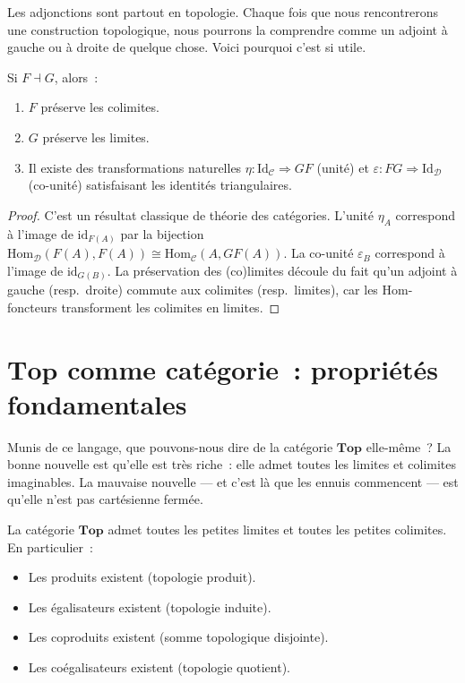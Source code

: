 Les adjonctions sont partout en topologie. Chaque fois que nous
rencontrerons une construction topologique, nous pourrons la comprendre
comme un adjoint \`a gauche ou \`a droite de quelque chose. Voici pourquoi
c'est si utile.

\begin{theoreme}
Si $F \dashv G$, alors~:
\begin{enumerate}
  \item $F$ pr\'eserve les colimites.
  \item $G$ pr\'eserve les limites.
  \item Il existe des transformations naturelles $\eta\colon \mathrm{Id}_\mathcal{C}
    \Rightarrow GF$ (unit\'e) et $\varepsilon\colon FG \Rightarrow \mathrm{Id}_\mathcal{D}$
    (co-unit\'e) satisfaisant les identit\'es triangulaires.
\end{enumerate}
\end{theoreme}

\begin{proof}
C'est un r\'esultat classique de th\'eorie des cat\'egories. L'unit\'e $\eta_A$ correspond
\`a l'image de $\mathrm{id}_{F(A)}$ par la bijection
$\mathrm{Hom}_\mathcal{D}(F(A),F(A)) \cong \mathrm{Hom}_\mathcal{C}(A,GF(A))$.
La co-unit\'e $\varepsilon_B$ correspond \`a l'image de $\mathrm{id}_{G(B)}$. La
pr\'eservation des (co)limites d\'ecoule du fait qu'un adjoint \`a gauche (resp.\ droite)
commute aux colimites (resp.\ limites), car les Hom-foncteurs transforment les colimites
en limites.
\end{proof}

\section{$\mathbf{Top}$ comme cat\'egorie~: propri\'et\'es fondamentales}

Munis de ce langage, que pouvons-nous dire de la cat\'egorie $\mathbf{Top}$
elle-m\^eme~? La bonne nouvelle est qu'elle est tr\`es riche~: elle admet
toutes les limites et colimites imaginables. La mauvaise nouvelle --- et
c'est l\`a que les ennuis commencent --- est qu'elle n'est pas
cart\'esienne ferm\'ee.

\begin{theoreme}
La cat\'egorie $\mathbf{Top}$ admet toutes les petites limites et toutes les petites
colimites. En particulier~:
\begin{itemize}
  \item Les produits existent (topologie produit).
  \item Les \'egalisateurs existent (topologie induite).
  \item Les coproduits existent (somme topologique disjointe).
  \item Les co\'egalisateurs existent (topologie quotient).
\end{itemize}
\end{theoreme}

